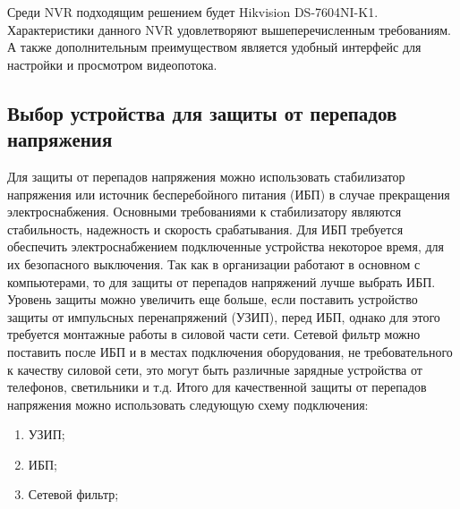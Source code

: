 Среди NVR подходящим решением будет Hikvision DS-7604NI-K1. Характеристики данного NVR удовлетворяют вышеперечисленным требованиям. А также дополнительным преимуществом
является удобный интерфейс для настройки и просмотром видеопотока.

\subsection{Выбор устройства для защиты от перепадов напряжения}

Для защиты от перепадов напряжения можно использовать стабилизатор напряжения или источник бесперебойного питания (ИБП) в случае прекращения электроснабжения.
Основными требованиями к стабилизатору являются стабильность, надежность и скорость срабатывания. Для ИБП требуется обеспечить 
электроснабжением подключенные устройства некоторое время, для их безопасного выключения. Так как в организации
работают в основном с компьютерами, то для защиты от перепадов напряжений лучше выбрать ИБП. Уровень защиты можно увеличить еще больше,
если поставить устройство защиты от импульсных перенапряжений (УЗИП), перед ИБП, однако для этого требуется монтажные работы в силовой части сети. 
Сетевой фильтр можно поставить после 
ИБП и в местах подключения оборудования, не требовательного к качеству силовой сети, это могут быть различные зарядные устройства от телефонов, светильники и т.д.
Итого для качественной защиты от перепадов напряжения можно использовать следующую схему подключения:
\begin{enumerate}
    \item УЗИП;
    \item ИБП;
    \item Сетевой фильтр;
\end{enumerate}

